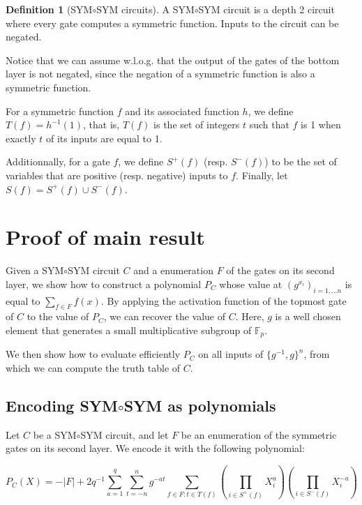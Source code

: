 \documentclass[a4paper, 11pt]{article}
\theoremstyle{plain}
\theoremstyle{definition}
\newtheorem{definition}[theorem]{Definition}
\theoremstyle{remark}
\newcommand{\FF}{\mathbb{F}}%
\newcommand{\gbit}{\{g^{-1},g\}}%
\newcommand{\ssym}{\textsf{SYM$\circ$SYM}}%
\begin{document}
\begin{definition}[\ssym{} circuits]
	A \ssym{} circuit is a depth 2 circuit where every gate computes a symmetric function.
	Inputs to the circuit can be negated.
\end{definition}
Notice that we can assume w.l.o.g. that the output of the gates of the bottom layer is not negated, since the negation of a symmetric function is also a symmetric function.

For a symmetric function $f$ and its associated function $h$, we define $T(f) = h^{-1}(1)$,
that is, $T(f)$ is the set of integers $t$ such that $f$ is 1 when exactly $t$ of its inputs are equal to 1.

Additionnally, for a gate $f$, we define $S^+(f)$ (resp. $S^-(f)$)
to be the set of variables that are positive (resp. negative) inputs to $f$.
Finally, let $S(f) = S^+(f) \cup S^-(f)$.


\section{Proof of main result}
Given a \ssym{} circuit $C$ and a enumeration $F$ of the gates on its second layer, we show how to construct a polynomial $P_C$ 
whose value at $(g^{x_i})_{i =1,\ldots n}$ is equal to $\sum_{f \in F} f(x)$.
By applying the activation function of the topmost gate of $C$ to the 
value of $P_C$, we can recover the value of $C$.
Here, $g$ is a well chosen element that generates a small multiplicative subgroup of $\FF_p$.

We then show how to evaluate efficiently $P_C$ on all inputs of $\gbit^n$,
from which we can compute the truth table of $C$.

\subsection{Encoding \ssym{} as polynomials}

Let $C$ be a \ssym{} circuit, and let $F$ be an enumeration of the symmetric gates on its second layer. We encode it with the following polynomial:

\[P_C(X) = -|F| + 2q^{-1}\sum_{a = 1}^q \sum_{t = -n}^n g^{-at} \sum_{f \in F : t\in T(f)} \left(\prod_{i \in S^+(f)} X_i^a\right) \left(\prod_{i \in S^-(f)} X_i^{-a}\right)\]
\end{document}
